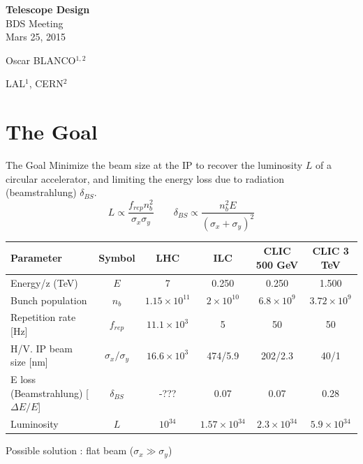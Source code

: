 \documentclass{beamer}
\begin{document}
\begin{frame}
\CERNlogo
\LALlogo
\vspace*{3cm}
\begin{center}
{\LARGE\color{blue} \textbf{Telescope Design}\\BDS Meeting\\Mars 25, 2015}\par
\vspace*{1cm}
Oscar BLANCO$^{1,2}$\par
LAL$^1$, CERN$^2$\par
\end{center}
\end{frame}
\section{The Goal}
\begin{frame}{The Goal}
 Minimize the beam size at the IP to recover the luminosity $L$ of a circular accelerator, and limiting the energy loss due to radiation (beamstrahlung) $\delta_{BS}$.
 \begin{equation*}
  L \propto \frac{f_{rep}n_b^2}{\sigma_x\sigma_y}\qquad\delta_{BS}\propto\frac{n_b^2E}{(\sigma_x+\sigma_y)^2}
 \end{equation*}
 {\tiny
 \begin{center}
\begin{tabular}{|l|c||c|c|c|c|}\hline
Parameter & Symbol & LHC & ILC & CLIC 500 GeV& CLIC 3 TeV\\\hline\hline
Energy/z (TeV) & $E$& 7& 0.250 & 0.250 & 1.500\\
Bunch population & $n_b$ &$1.15\times10^{11}$&$2\times10^{10}$&$6.8\times10^9$&$3.72\times10^9$\\
Repetition rate [Hz] &$f_{rep}$& $11.1\times10^{3}$&5 &50&50\\
H/V. IP beam size [nm] & $\sigma_x/\sigma_y$&$16.6\times10^{3}$&474/5.9&202/2.3&40/1\\\hline
E loss (Beamstrahlung) [$\Delta E/E$] &$\delta_{BS}$&-???&0.07&0.07&0.28\\
Luminosity &$L$& $10^{34}$ &$1.57\times10^{34}$ & $2.3\times10^{34}$&$5.9\times10^{34}$\\\hline
\end{tabular}
\end{center}
}
Possible solution : flat beam ($\sigma_x\gg\sigma_y$)
\end{frame}
\end{document}
